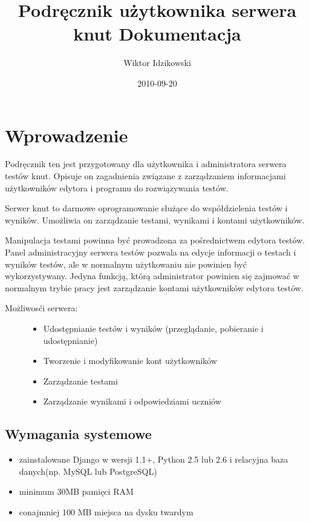 \documentclass[letterpaper,10pt,polish]{sphinxmanual}
\title{Podręcznik użytkownika serwera knut Dokumentacja}
\date{2010-09-20}
\author{Wiktor Idzikowski}
\begin{document}
\maketitle
\tableofcontents
{}\label{index::doc}



\chapter{Wprowadzenie}
\label{index:id1}\label{index:witamy-w-podreczniku-uzytkownika-serwera-knut}\label{index:wprowadzenie}
Podręcznik ten jest przygotowany dla użytkownika i administratora serwera testów knut. Opisuje on zagadnienia związane z zarządzaniem informacjami  użytkowników edytora i programu do rozwiązywania testów.

Serwer knut to darmowe oprogramowanie służące do współdzielenia testów i wyników.
Umożliwia on zarządzanie testami, wynikami i kontami użytkowników.

Manipulacja testami powinna być prowadzona za pośrednictwem edytora testów. Panel administracyjny serwera testów pozwala na edycje informacji o testach i wyników testów, ale w normalnym użytkowaniu nie powinien być wykorzystywany. Jedyna funkcją, którą administrator powinien się zajmować w normalnym trybie pracy jest zarządzanie kontami użytkowników edytora testów.
\begin{description}
\item[{Możliwosći serwera:}] \leavevmode\begin{itemize}
\item {} 
Udostępnianie testów i wyników (przeglądanie, pobieranie i udostępnianie)

\item {} 
Tworzenie i modyfikowanie kont użytkowników

\item {} 
Zarządzanie testami

\item {} 
Zarządzanie wynikami i odpowiedziami uczniów

\end{itemize}

\end{description}


\section{Wymagania systemowe}
\label{index:wymagania-systemowe}\label{index:id2}\begin{itemize}
\item {} 
zainstalowane Django w wersji 1.1+, Python 2.5 lub 2.6 i relacyjna baza danych(np. MySQL lub PostgreSQL)

\item {} 
minimum 30MB pamięci RAM

\item {} 
conajmniej 100 MB miejsca na dysku twardym

\end{itemize}
\end{document}
